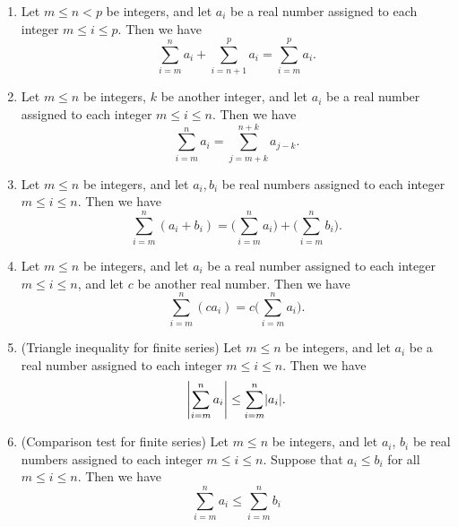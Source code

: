 \begin{lem}\label{i:7.1.4}
  \begin{enumerate}
    \item\label{i:7.1.4.a} Let \(m \leq n < p\) be integers, and let \(a_i\) be a real number assigned to each integer \(m \leq i \leq p\).
    Then we have
    \[
      \sum_{i = m}^n a_i + \sum_{i = n + 1}^p a_i = \sum_{i = m}^p a_i.
    \]
    \item\label{i:7.1.4.b} Let \(m \leq n\) be integers, \(k\) be another integer, and let \(a_i\) be a real number assigned to each integer \(m \leq i \leq n\).
    Then we have
    \[
      \sum_{i = m}^n a_i = \sum_{j = m + k}^{n + k} a_{j - k}.
    \]
    \item\label{i:7.1.4.c} Let \(m \leq n\) be integers, and let \(a_i, b_i\) be real numbers assigned to each integer \(m \leq i \leq n\).
    Then we have
    \[
      \sum_{i = m}^n (a_i + b_i) = \Bigg(\sum_{i = m}^n a_i\Bigg) + \Bigg(\sum_{i = m}^n b_i\Bigg).
    \]
    \item\label{i:7.1.4.d} Let \(m \leq n\) be integers, and let \(a_i\) be a real number assigned to each integer \(m \leq i \leq n\), and let \(c\) be another real number.
    Then we have
    \[
      \sum_{i = m}^n (ca_i) = c\Bigg(\sum_{i = m}^n a_i\Bigg).
    \]
    \item\label{i:7.1.4.e} (Triangle inequality for finite series)
    Let \(m \leq n\) be integers, and let \(a_i\) be a real number assigned to each integer \(m \leq i \leq n\).
    Then we have
    \[
      \abs{\sum_{i = m}^n a_i} \leq \sum_{i = m}^n \abs{a_i}.
    \]
    \item\label{i:7.1.4.f} (Comparison test for finite series) Let \(m \leq n\) be integers, and let \(a_i\), \(b_i\) be real numbers assigned to each integer \(m \leq i \leq n\).
    Suppose that \(a_i \leq b_i\) for all \(m \leq i \leq n\).
    Then we have
    \[
      \sum_{i = m}^n a_i \leq \sum_{i = m}^n b_i
    \]
  \end{enumerate}
\end{lem}

